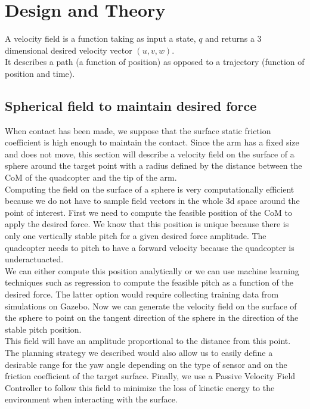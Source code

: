 \section{Design and Theory}

A velocity field is a function taking as input a state, $q$ and returns a 3 dimensional desired velocity vector $(u,v,w)$.\\ It describes a path (a function of position) as opposed to a trajectory (function of position and time).

\subsection{Spherical field to maintain desired force }
When contact has been made, we suppose that the surface static friction coefficient is high enough to maintain the contact.
Since the arm has a fixed size and does not move, this section will describe a velocity field on the surface of a sphere around the target point with a radius defined by the distance between the CoM of the quadcopter and the tip of the arm.\\
Computing the field on the surface of a sphere is very computationally efficient because we do not have to sample field vectors in the whole 3d space around the point of interest.
First we need to compute the feasible position of the CoM to apply the desired force. 
We know that this position is unique because there is only one vertically stable pitch for a given desired force amplitude. The quadcopter needs to pitch to have a forward velocity because the quadcopter is underactuacted.\\
We can either compute this position analytically or we can use machine learning techniques such as regression to compute the feasible pitch as a function of the desired force. The latter option would require collecting training data from simulations on Gazebo. 
Now we can generate the velocity field on the surface of the sphere to point on the tangent direction of the sphere in the direction of the stable pitch position. \\
This field will have an amplitude proportional to the distance from this point.
The planning strategy we described would also allow us to easily define a desirable range for the yaw angle depending on the type of sensor and on the friction coefficient of the target surface.
Finally, we use a Passive Velocity Field Controller \cite{li1999passive} to follow this field to minimize the loss of kinetic energy to the environment when interacting with the surface.
